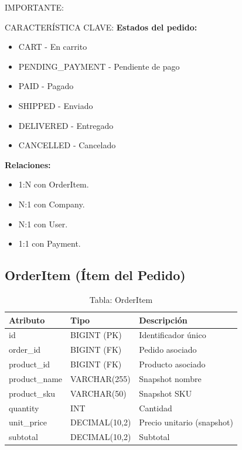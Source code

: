 \documentclass[12pt,a4paper,oneside]{book}
\begin{document}
\begin{alert}{IMPORTANTE:}
\begin{info}{CARACTERÍSTICA CLAVE:}
\textbf{Estados del pedido:}
\begin{itemize}
    \item CART - En carrito
    \item PENDING\_PAYMENT - Pendiente de pago
    \item PAID - Pagado
    \item SHIPPED - Enviado
    \item DELIVERED - Entregado
    \item CANCELLED - Cancelado
\end{itemize}

\textbf{Relaciones:}
\begin{itemize}
    \item 1:N con OrderItem.
    \item N:1 con Company.
    \item N:1 con User.
    \item 1:1 con Payment.
\end{itemize}

\subsection{OrderItem (Ítem del Pedido)}
\label{sec:orderitem}

\begin{table}[ht]
    \centering
    \caption{Tabla: OrderItem}
    \begin{tabular}{@{}lll@{}}
        \toprule
        \textbf{Atributo} & \textbf{Tipo} & \textbf{Descripción} \\
        \midrule
        id & BIGINT (PK) & Identificador único \\
        order\_id & BIGINT (FK) & Pedido asociado \\
        product\_id & BIGINT (FK) & Producto asociado \\
        product\_name & VARCHAR(255) & Snapshot nombre \\
        product\_sku & VARCHAR(50) & Snapshot SKU \\
        quantity & INT & Cantidad \\
        unit\_price & DECIMAL(10,2) & Precio unitario (snapshot) \\
        subtotal & DECIMAL(10,2) & Subtotal \\
        \bottomrule
    \end{tabular}
\end{table}


\end{info}
\end{alert}
\end{document}
